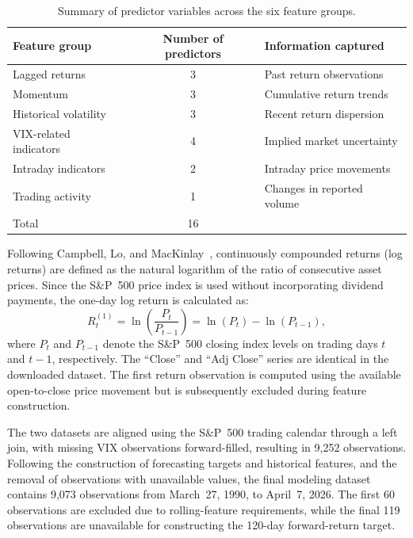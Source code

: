 \documentclass[runningheads,orivec]{llncs}
\begin{document}
\begin{table}[htbp]
\caption{Summary of predictor variables across the six feature groups.}\label{tab:predictors}
\centering
\begin{tabular}{lcl}
\hline
Feature group & Number of predictors & Information captured \\
\hline
Lagged returns & 3 & Past return observations \\
Momentum & 3 & Cumulative return trends \\
Historical volatility & 3 & Recent return dispersion \\
VIX-related indicators & 4 & Implied market uncertainty \\
Intraday indicators & 2 & Intraday price movements \\
Trading activity & 1 & Changes in reported volume \\
\hline
Total & 16 & \\
\hline
\end{tabular}
\end{table}

Following Campbell, Lo, and MacKinlay~\cite{campbell1998}, continuously compounded returns (log returns) are defined as the natural logarithm of the ratio of consecutive asset prices. Since the S\&P~500 price index is used without incorporating dividend payments, the one-day log return is calculated as:
\begin{equation}\label{eq:daily_log_return}
R_t^{(1)} = \ln\left(\frac{P_t}{P_{t-1}}\right) = \ln(P_t) - \ln(P_{t-1}),
\end{equation}
where $P_t$ and $P_{t-1}$ denote the S\&P~500 closing index levels on trading days $t$ and $t-1$, respectively. The ``Close'' and ``Adj Close'' series are identical in the downloaded dataset. The first return observation is computed using the available open-to-close price movement but is subsequently excluded during feature construction.

The two datasets are aligned using the S\&P~500 trading calendar through a left join, with missing VIX observations forward-filled, resulting in 9,252 observations. Following the construction of forecasting targets and historical features, and the removal of observations with unavailable values, the final modeling dataset contains 9,073 observations from March~27, 1990, to April~7, 2026. The first 60 observations are excluded due to rolling-feature requirements, while the final 119 observations are unavailable for constructing the 120-day forward-return target.
\end{document}
